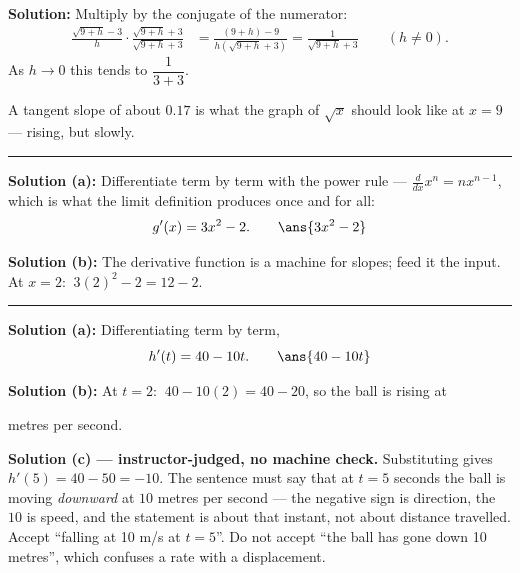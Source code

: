 \documentclass[12pt]{article}
\begin{document}
\textbf{Solution:} Multiply by the conjugate of the numerator:
\begin{align*}
  \frac{\sqrt{9+h} - 3}{h} \cdot \frac{\sqrt{9+h} + 3}{\sqrt{9+h} + 3}
    &= \frac{(9+h) - 9}{h\left(\sqrt{9+h} + 3\right)}
     = \frac{1}{\sqrt{9+h} + 3} \qquad (h \neq 0).
\end{align*}
As $h \to 0$ this tends to $\dfrac{1}{3 + 3}$. 

A tangent slope of about $0.17$ is what the graph of $\sqrt{x}$ should look
like at $x = 9$ --- rising, but slowly.

\vspace{0.2cm}\noindent\rule{\linewidth}{0.2pt}\vspace{0.2cm}


\textbf{Solution (a):} Differentiate term by term with the power rule ---
$\frac{d}{dx}x^n = nx^{n-1}$, which is what the limit definition produces once
and for all:
\[
  g'(x) = 3x^2 - 2 . \qquad \ans{3x^2 - 2}
\]

\textbf{Solution (b):} The derivative function is a machine for slopes; feed it
the input. At $x = 2$: $\ 3(2)^2 - 2 = 12 - 2$. 

\vspace{0.2cm}\noindent\rule{\linewidth}{0.2pt}\vspace{0.2cm}


\textbf{Solution (a):} Differentiating term by term,
\[
  h'(t) = 40 - 10t . \qquad \ans{40 - 10t}
\]

\textbf{Solution (b):} At $t = 2$: $\ 40 - 10(2) = 40 - 20$, so the ball is
rising at 

metres per second.

\textbf{Solution (c) --- instructor-judged, no machine check.} Substituting
gives $h'(5) = 40 - 50 = -10$. The sentence must say that at $t = 5$ seconds the
ball is moving \emph{downward} at $10$ metres per second --- the negative sign is
direction, the $10$ is speed, and the statement is about that instant, not about
distance travelled. Accept ``falling at 10 m/s at $t = 5$''. Do not accept ``the
ball has gone down 10 metres'', which confuses a rate with a displacement.
\end{document}
